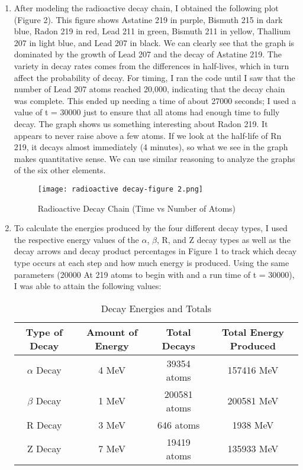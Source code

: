 \documentclass[12pt]{article}
\begin{document}
\begin{enumerate} 
\item After modeling the radioactive decay chain, I obtained the following plot (Figure 2). This figure shows Astatine 219 in purple, Bismuth 215 in dark blue, Radon 219 in red, Lead 211 in green, Bismuth 211 in yellow, Thallium 207 in light blue, and Lead 207 in black. We can clearly see that the graph is dominated by the growth of Lead 207 and the decay of Astatine 219. The variety in decay rates comes from the differences in half-lives, which in turn affect the probability of decay. For timing, I ran the code until I saw that the number of Lead 207 atoms reached 20,000, indicating that the decay chain was complete. This ended up needing a time of about 27000 seconds; I used a value of t = 30000 just to ensure that all atoms had enough time to fully decay.  The graph shows us something interesting about Radon 219. It appears to never raise above a few atoms. If we look at the half-life of Rn 219, it decays almost immediately (4 minutes), so what we see in the graph makes quantitative sense.  We can use similar reasoning to analyze the graphs of the six other elements.

\begin{figure} [h]
    \centering
    \texttt{[image: radioactive decay-figure 2.png]}
    \caption{Radioactive Decay Chain (Time vs Number of Atoms)}
    \label{fig:enter-label}
\end{figure}

\item To calculate the energies produced by the four different decay types, I used the respective energy values of the $\alpha$, $\beta$, R, and Z decay types as well as the decay arrows and decay product percentages in Figure 1 to track which decay type occurs at each step and how much energy is produced. Using the same parameters (20000 At 219 atoms to begin with and a run time of t = 30000), I was able to attain the following values: \\
\begin{table} [h]
    \centering
    \begin{tabular}{|c|c|c|c|}
        \hline
        Type of Decay & Amount of Energy & Total Decays & Total Energy Produced\\ \hline
        $\alpha$ Decay & 4 MeV & 39354 atoms & 157416 MeV\\ \hline
        $\beta$ Decay & 1 MeV & 200581 atoms & 200581 MeV\\ \hline
        R Decay & 3 MeV & 646 atoms & 1938 MeV\\ \hline
        Z Decay & 7 MeV & 19419 atoms & 135933 MeV\\ \hline
    \end{tabular}
    \caption{Decay Energies and Totals}
    \label{tab:my_label}
\end{table}


\end{enumerate}
\end{document}
